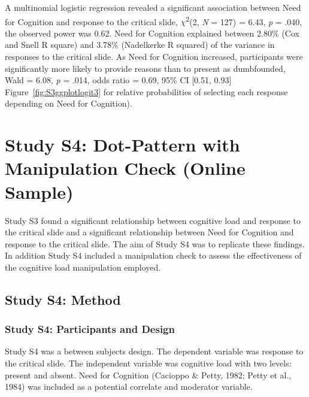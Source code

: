 \documentclass[
  american,
  man,floatsintext]{apa7}
\begin{document}
\newpage

A multinomial logistic regression revealed a significant association between Need for Cognition and response to the critical slide, \(\chi\)\textsuperscript{2}(2, \emph{N} = 127) = 6.43, \emph{p} = .040, the observed power was 0.62. Need for Cognition explained between 2.80\% (Cox and Snell R square) and 3.78\% (Nadelkerke R squared) of the variance in responses to the critical slide. As Need for Cognition increased, participants were significantly more likely to provide reasons than to present as dumbfounded, Wald = 6.08, \emph{p} = .014, odds ratio = 0.69, 95\% CI {[}0.51, 0.93{]} Figure~\ref{fig:S3ggplotlogit3} for relative probabilities of selecting each response depending on Need for Cognition).

\newpage

\hypertarget{study-s4-dot-pattern-with-manipulation-check-online-sample}{%
\section{Study S4: Dot-Pattern with Manipulation Check (Online Sample)}\label{study-s4-dot-pattern-with-manipulation-check-online-sample}}

Study S3 found a significant relationship between cognitive load and response to the critical slide and a significant relationship between Need for Cognition and response to the critical slide. The aim of Study S4 was to replicate these findings. In addition Study S4 included a manipulation check to assess the effectiveness of the cognitive load manipulation employed.

\hypertarget{study-s4-method}{%
\subsection{Study S4: Method}\label{study-s4-method}}

\hypertarget{study-s4-participants-and-design}{%
\subsubsection{Study S4: Participants and Design}\label{study-s4-participants-and-design}}

Study S4 was a between subjects design. The dependent variable was response to the critical slide. The independent variable was cognitive load with two levels: present and absent. Need for Cognition (Cacioppo \& Petty, 1982; Petty et al., 1984) was included as a potential correlate and moderator variable.
\end{document}
